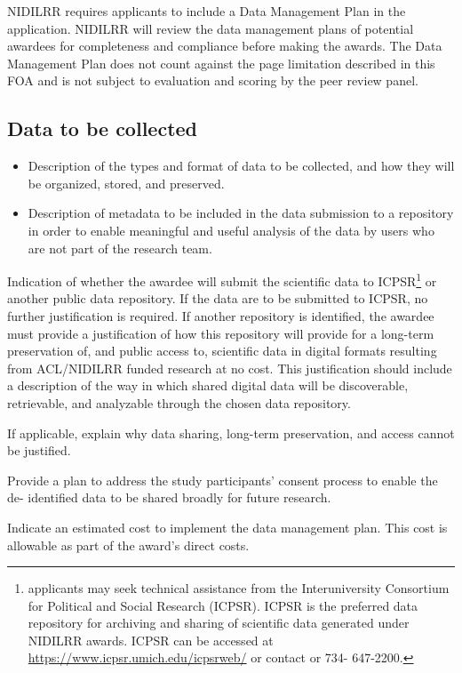 NIDILRR requires applicants to include a Data Management Plan in the application. NIDILRR will review the data management plans of potential awardees for completeness and compliance before making the awards. The Data Management Plan does not count against the page limitation described in this FOA and is not subject to evaluation and scoring by the peer review panel.

\subsection{Data to be collected}
\begin{itemize}
    \item Description of the types and format of data to be collected, and how they will be organized, stored, and preserved.
    \item Description of metadata to be included in the data submission to a repository in order to enable meaningful and useful analysis of the data by users who are not part of the research team.
\end{itemize}

Indication of whether the awardee will submit the scientific data to ICPSR\footnote{applicants may seek technical assistance from the Interuniversity Consortium for Political and Social Research (ICPSR). ICPSR is the preferred data repository for archiving and sharing of scientific data generated under NIDILRR awards. ICPSR can be
accessed at \url{https://www.icpsr.umich.edu/icpsrweb/} or contact  or 734- 647-2200.
} or another public data repository. If the data are to be submitted to ICPSR, no further justification is required. If another repository is identified, the awardee must provide a justification of how this repository will provide for a long-term preservation of, and public access to, scientific data in digital formats resulting from ACL/NIDILRR funded research at no cost. This justification should include a description of the way in which shared digital data will be discoverable, retrievable, and analyzable through the chosen data repository.

If applicable, explain why data sharing, long-term preservation, and access cannot be justified.

Provide a plan to address the study participants’ consent process to enable the de- identified data to be shared broadly for future research.

Indicate an estimated cost to implement the data management plan. This cost is allowable as part of the award’s direct costs.